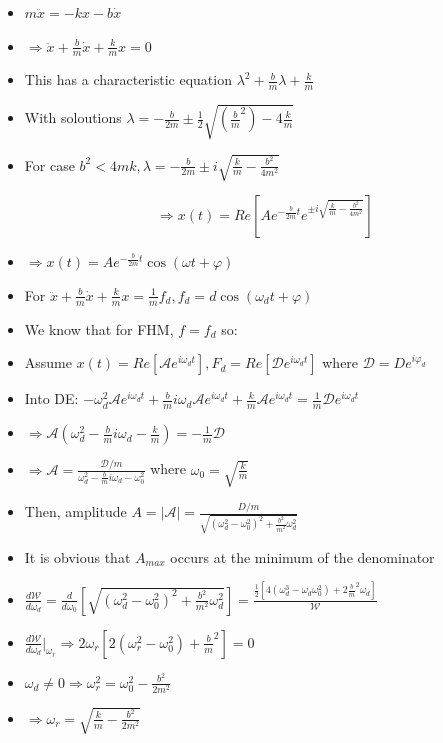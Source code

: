 \documentclass{article}
\begin{document}
\begin{itemize}
    \item \(m\ddot x = -kx - b\dot x\)
    \item \(\Rightarrow \ddot x + \frac{b}{m}\dot x + \frac{k}{m} x = 0\)
    \item This has a characteristic equation \(\lambda^2 + \frac{b}{m}\lambda + \frac{k}{m}\)
    \item With soloutions \(\lambda = - \frac{b}{2m} \pm \frac{1}{2}\sqrt{(\frac{b}{m}^2)-4\frac{k}{m}}\)
    \item For case \(b^2 < 4mk, \lambda = -\frac{b}{2m} \pm i\sqrt{\frac{k}{m} - \frac{b^2}{4m^2}}\)

    \[\Rightarrow x(t) = Re[Ae^{-\frac{b}{2m}t}e^{\pm i\sqrt{\frac{k}{m}-\frac{b^2}{4m^2}}}]\]
    \item \(\Rightarrow\boxed{ x(t) = Ae^{-\frac{b}{2m}t}\cos(\omega t + \varphi)}\)
\end{itemize}


\begin{itemize}
    \item For \(\ddot x + \frac{b}{m}\dot x + \frac{k}{m}x = \frac{1}{m}f_d, f_d = d\cos(\omega_d t+\varphi)\)
    \item We know that for FHM, \(f=f_d\) so:
    \item Assume \({x(t)=Re[\mathcal{A}e^{i\omega_d t}], F_d=Re[\mathcal{D}e^{i\omega_d t}]}\) where \(\mathcal{D} = De^{i\varphi_d}\)
    \item Into DE: \(-\omega_d^2\mathcal{A}e^{i\omega_d t} + \frac{b}{m}i\omega_d\mathcal{A}e^{i\omega_d t}+\frac{k}{m}\mathcal{A}e^{i\omega_d t}=\frac{1}{m}\mathcal{D}e^{i\omega_d t}\)
    \item \(\Rightarrow \mathcal{A}(\omega_d^2-\frac{b}{m}i\omega_d-\frac{k}{m})=-\frac{1}{m}\mathcal{D}\)
    \item \(\Rightarrow \mathcal{A}=\frac{\mathcal{D}/m}{\omega_d^2-\frac{b}{m}i\omega_d-\omega_0^2}\) where \(\omega_0=\sqrt{\frac{k}{m}}\)
    \item Then, amplitude \(A=|\mathcal{A}|=\frac{D/m}{\sqrt{(\omega_d^2-\omega_0^2)^2+\frac{b^2}{m^2}\omega_d^2}}\)
    \item It is obvious that \(A_{max}\) occurs at the minimum of the denominator
    \item \(\frac{d\mathcal{W}}{d\omega_d}=\frac{d}{d\omega_0}[\sqrt{(\omega_d^2-\omega_0^2)^2+\frac{b^2}{m^2}\omega_d^2}]=\frac{\frac{1}{2}[4(\omega_d^3-\omega_d\omega_0^2)+2\frac{b}{m}^2\omega_d]}{\mathcal{W}}\)
    \item \(\frac{d\mathcal{W}}{d\omega_d}\rvert_{\omega_r}\Rightarrow 2\omega_r[2(\omega_r^2-\omega_0^2)+\frac{b}{m}^2]=0\)
    \item \(\omega_d \not=0\Rightarrow\omega_r^2=\omega_0^2-\frac{b^2}{2m^2}\)
    \item \(\Rightarrow\boxed{\omega_r=\sqrt{\frac{k}{m}-\frac{b^2}{2m^2}}}\)
\end{itemize}
\end{document}
